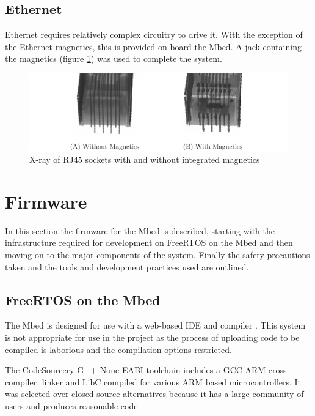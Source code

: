 		\subsection{Ethernet}
			
			Ethernet requires relatively complex circuitry to drive it. With the
			exception of the Ethernet magnetics, this is provided on-board the Mbed. A
			jack containing the magnetics (figure \ref{fig:jackMagnetics}) was used to
			complete the system.
			
			\begin{figure}
				\includegraphics[width=1\textwidth]{diagrams/jackMagnetics.pdf}
				\caption{X-ray of RJ45 sockets with and without integrated magnetics
				         \cite{raspimag}}
				\label{fig:jackMagnetics}
			\end{figure}
	
	\section{Firmware}
		
		In this section the firmware for the Mbed is described, starting with the
		infrastructure required for development on FreeRTOS on the Mbed and then
		moving on to the major components of the system. Finally the safety
		precautions taken and the tools and development practices used are outlined.
		
		\subsection{FreeRTOS on the Mbed}
			
			\label{sec:compiler}
			
			The Mbed is designed for use with a web-based IDE and compiler
			\cite{mbedcompiler}. This system is not appropriate for use in the project
			as the process of uploading code to be compiled is laborious and the
			compilation options restricted.
			
			The CodeSourcery G++ None-EABI toolchain includes a GCC ARM cross-compiler,
			linker and LibC compiled for various ARM based microcontrollers. It was
			selected over closed-source alternatives because it has a large community of
			users and produces reasonable code.
			
